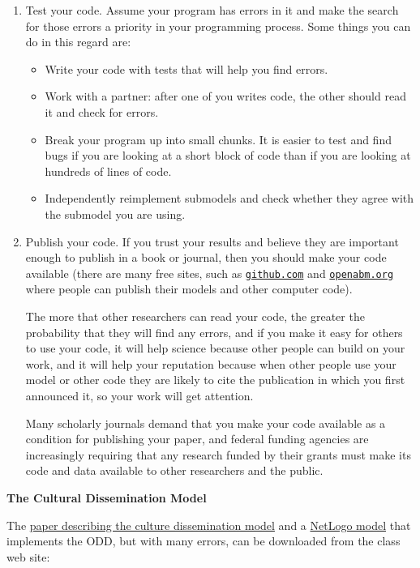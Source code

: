 \documentclass[
]{article}
\providecommand{\tightlist}{%
  \setlength{\itemsep}{0pt}\setlength{\parskip}{0pt}}
\begin{document}
\begin{enumerate}
\def\labelenumi{\arabic{enumi}.}
\item
  Test your code. Assume your program has errors in it and make the
  search for those errors a priority in your programming process. Some
  things you can do in this regard are:

  \begin{itemize}
  \tightlist
  \item
    Write your code with tests that will help you find errors.
  \item
    Work with a partner: after one of you writes code, the other should
    read it and check for errors.
  \item
    Break your program up into small chunks. It is easier to test and
    find bugs if you are looking at a short block of code than if you
    are looking at hundreds of lines of code.
  \item
    Independently reimplement submodels and check whether they agree
    with the submodel you are using.
  \end{itemize}
\item
  Publish your code. If you trust your results and believe they are
  important enough to publish in a book or journal, then you should make
  your code available (there are many free sites, such as
  \href{https://github.com}{\texttt{github.com}} and
  \href{https://openabm.org}{\texttt{openabm.org}} where people can
  publish their models and other computer code).

  The more that other researchers can read your code, the greater the
  probability that they will find any errors, and if you make it easy
  for others to use your code, it will help science because other people
  can build on your work, and it will help your reputation because when
  other people use your model or other code they are likely to cite the
  publication in which you first announced it, so your work will get
  attention.

  Many scholarly journals demand that you make your code available as a
  condition for publishing your paper, and federal funding agencies are
  increasingly requiring that any research funded by their grants must
  make its code and data available to other researchers and the public.
\end{enumerate}

\textbf{The Cultural Dissemination Model}

The
\href{/files/models/chapter_06/axelrod_culture_dissemination_1997.pdf}{paper
describing the culture dissemination model} and a
\href{files/models/chapter_06/CultureDissemination_Untested.nlogo}{NetLogo
model} that implements the ODD, but with many errors, can be downloaded
from the class web site:
\end{document}
